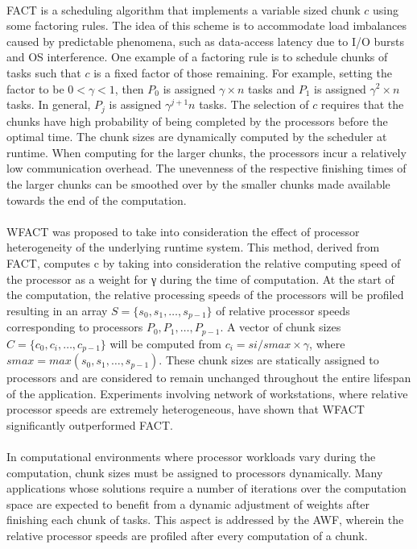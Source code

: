 \documentclass[10pt, twocolumn, letterpaper]{article}
\begin{document}
\paragraph{}
FACT is a scheduling algorithm that implements a variable sized chunk $c$ using some factoring rules. The idea of this scheme is to accommodate load imbalances caused by predictable phenomena, such as data-access latency due to I/O bursts and OS interference. One example of a factoring rule is to schedule chunks of tasks such that $c$ is a fixed factor of those remaining. For example, setting the factor to be $0 < \gamma < 1$, then $P_0$ is assigned $\gamma\times n$ tasks and $P_1$ is assigned $\gamma^2\times n$ tasks. In general, $P_j$ is assigned $\gamma^{j+1}  n$ tasks. The selection of $c$ requires that the chunks have high probability of being completed by the processors before the optimal time. The chunk sizes are dynamically computed by the scheduler at runtime. When computing for the larger chunks, the processors incur a relatively low communication overhead. The unevenness of the respective finishing times of the larger chunks can be smoothed over by the smaller chunks made available towards the end of the computation.

\paragraph{}
WFACT was proposed to take into consideration the effect of processor heterogeneity of the underlying runtime system. This method, derived from FACT, computes c by taking into consideration the relative computing speed of the processor as a weight for γ during the time of computation. At the start of the computation, the relative processing speeds of the processors will be profiled resulting in an array $S = \{s_0, s_1,\dots, s_{p−1}\}$ of relative processor speeds corresponding to processors $P_0, P_1, \dots, P_{p−1}$. A vector of chunk sizes $C = \{c_0, c_i,\dots, c_{p−1}\}$ will be computed from $c_i = si/smax \times\gamma$, where $smax = max(s_0, s_1,\dots, s_{p−1})$. These chunk sizes are statically assigned to processors and are considered to remain unchanged throughout the entire lifespan of the application. Experiments involving network of workstations, where relative processor speeds are extremely heterogeneous, have shown that WFACT significantly outperformed FACT.

\paragraph{}
In computational environments where processor workloads vary during the computation, chunk sizes must be assigned to processors dynamically. Many applications whose solutions require a number of iterations over the computation space are expected to benefit from a dynamic adjustment of weights after finishing each chunk of tasks. This aspect is addressed by the AWF, wherein the relative processor speeds are profiled after every computation of a chunk.
\end{document}
